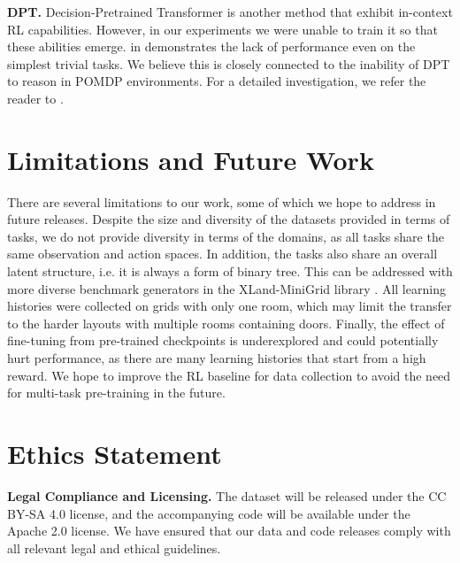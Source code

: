 \documentclass{article}
\begin{document}

\textbf{DPT.} Decision-Pretrained Transformer \citep{lee2023supervised} is another method that exhibit in-context RL capabilities. However, in our experiments we were unable to train it so that these abilities emerge.  in  demonstrates the lack of performance even on the simplest trivial tasks. We believe this is closely connected to the inability of DPT to reason in POMDP environments. For a detailed investigation, we refer the reader to .



\section{Limitations and Future Work}
\label{sec:limit}

There are several limitations to our work, some of which we hope to address in future releases. Despite the size and diversity of the datasets provided in terms of tasks, we do not provide diversity in terms of the domains, as all tasks share the same observation and action spaces. In addition, the tasks also share an overall latent structure, i.e. it is always a form of binary tree. This can be addressed with more diverse benchmark generators in the XLand-MiniGrid library \citep{nikulin2023xland}. All learning histories were collected on grids with only one room, which may limit the transfer to the harder layouts with multiple rooms containing doors. Finally, the effect of fine-tuning from pre-trained checkpoints is underexplored and could potentially hurt performance, as there are many learning histories that start from a high reward. We hope to improve the RL baseline for data collection to avoid the need for multi-task pre-training in the future.

\section*{Ethics Statement}
\textbf{Legal Compliance and Licensing.} The dataset will be released under the CC BY-SA 4.0 license, and the accompanying code will be available under the Apache 2.0 license. We have ensured that our data and code releases comply with all relevant legal and ethical guidelines.
\end{document}
